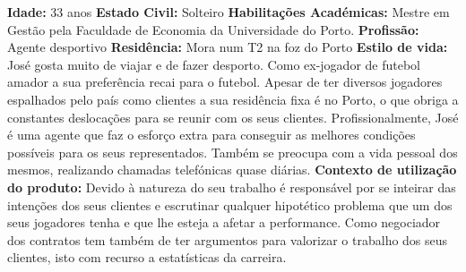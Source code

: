 \noindent\textbf{Idade:} 33 anos
\newline\textbf{Estado Civil:} Solteiro
\newline\textbf{Habilitações Académicas:} Mestre em Gestão pela Faculdade de Economia da Universidade do Porto.
\newline\textbf{Profissão:} Agente desportivo
\newline\textbf{Residência:} Mora num T2 na foz do Porto
\vspace{3mm}
\newline\textbf{Estilo de vida:} José gosta muito de viajar e de fazer desporto. Como ex-jogador de futebol amador a sua preferência recai para o futebol. Apesar de ter diversos jogadores espalhados pelo país como clientes a sua residência fixa é no Porto, o que obriga a constantes deslocações para se reunir com os seus clientes. Profissionalmente, José é uma agente que faz o esforço extra para conseguir as melhores condições possíveis para os seus representados. Também se preocupa com a vida pessoal dos mesmos, realizando chamadas telefónicas quase diárias.
\vspace{3mm}
\newline\textbf{Contexto de utilização do produto:} Devido à natureza do seu trabalho é responsável por se inteirar das intenções dos seus clientes e escrutinar qualquer hipotético problema que um dos seus jogadores tenha e que lhe esteja a afetar a performance. 
Como negociador dos contratos tem também de ter argumentos para valorizar o trabalho dos seus clientes, isto com recurso a estatísticas da carreira.
\vspace{3mm}

